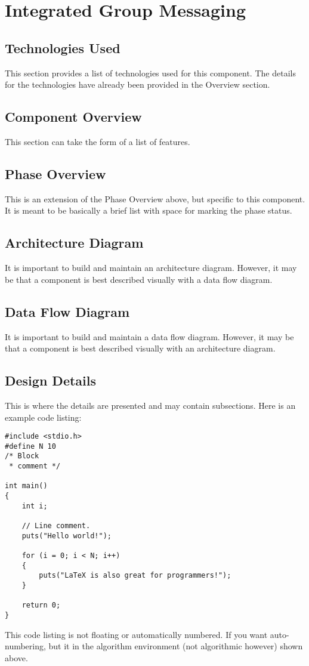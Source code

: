 \section{Integrated Group Messaging}

\subsection{Technologies  Used}
This section provides a list of technologies used for this component.  The details 
for the technologies have already been provided in the Overview section. 

\subsection{Component  Overview}
This section can take the form of a list of features. 

\subsection{Phase Overview}
This is an extension of the Phase Overview above, but specific to this component. 
 It is meant to be basically a brief list with space for marking the phase status. 

\subsection{ Architecture  Diagram}
It is important to build and maintain an architecture diagram.  However, it may 
be that a component is best described visually with a data flow diagram. 


\subsection{Data Flow Diagram}
It is important to build and maintain a data flow diagram.  However, it may be 
that a component is best described visually with an architecture diagram. 


\subsection{Design Details}
This is where the details are presented and may contain subsections.   Here is an example code listing:
\begin{lstlisting}
#include <stdio.h>
#define N 10
/* Block
 * comment */
 
int main()
{
    int i;
 
    // Line comment.
    puts("Hello world!");
 
    for (i = 0; i < N; i++)
    {
        puts("LaTeX is also great for programmers!");
    }
 
    return 0;
}
\end{lstlisting}
This code listing is not floating or automatically numbered.  If you want auto-numbering, but it in the algorithm environment (not algorithmic however) shown above.




